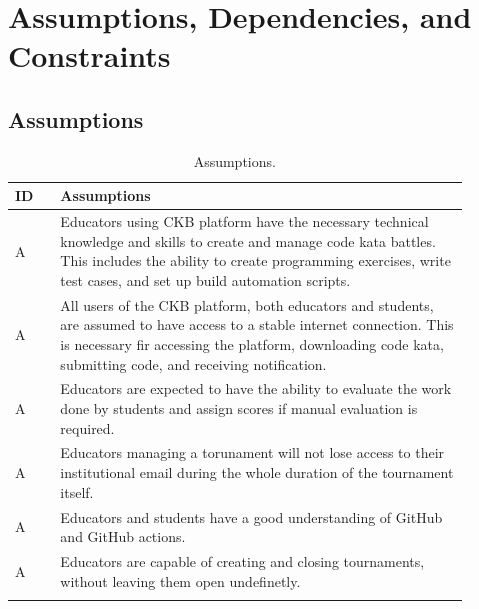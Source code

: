 \section{Assumptions, Dependencies, and Constraints}
\label{subsec:Assumptions, Dependencies, and Constraints}%

\subsection{Assumptions}

\setcounter{ac}{0}
\newcommand{\ca}{\stepcounter{ac}\theac}

\newcommand{\myrow}[1]{
    A\ca & #1 \\
    \hline
}

\begin{center}
    \begin{longtable}{ |l|p{0.9\linewidth}| }
        \hline
        \textbf{ID} & \textbf{Assumptions}                                                                   \\
        \hline
        A\ca        & Educators using CKB platform have the necessary technical knowledge and skills to create and manage code kata battles. 
        This includes the ability to create programming exercises, write test cases, and set up build automation scripts.                                   \\
        \hline
        A\ca        & All users of the CKB platform, both educators and students, are assumed to have access to a stable internet connection. This is
         necessary fir accessing the platform, downloading code kata, submitting code, and receiving notification.                                  \\
        \hline
        A\ca        & Educators are expected to have the ability to evaluate the work done by students and assign scores if manual evaluation is required. \\
        \hline
        A\ca        & Educators managing a torunament will not lose access to their institutional email during the whole duration of the tournament itself.                                                             \\
        \hline
        A\ca        & Educators and students have a good understanding of GitHub and GitHub actions.                                  \\
        \hline
        A\ca        & Educators are capable of creating and closing tournaments, without leaving them open undefinetly.                      \\
        \hline
        \caption{Assumptions.}
        \label{tab:assumption_tab}%
    \end{longtable}
\end{center}

